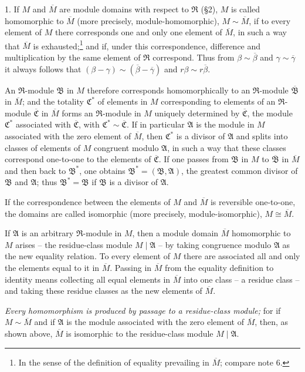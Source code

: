 \documentclass[11pt]{article}
\providecommand{\mR}{\mathfrak{R}}
\providecommand{\mA}{\mathfrak{A}}
\providecommand{\mB}{\mathfrak{B}}
\providecommand{\mC}{\mathfrak{C}}
\begin{document}
1. If $M$ and $\overline M$ are module domains with respect to $\mR$ (§2), $M$ is called homomorphic to $\overline M$ (more precisely, module-homomorphic), $M\sim\overline M$, if to every element of $M$ there corresponds one and only one element of $\overline M$, in such a way that $\overline M$ is exhausted;\footnote{In the sense of the definition of equality prevailing in $\overline M$; compare note 6.} and if, under this correspondence, difference and multiplication by the same element of $\mR$ correspond. Thus from $\beta\sim\overline\beta$ and $\gamma\sim\overline\gamma$ it always follows that $(\beta-\gamma)\sim(\overline\beta-\overline\gamma)$ and $r\beta\sim r\overline\beta$.

An $\mR$-module $\mB$ in $M$ therefore corresponds homomorphically to an $\mR$-module $\overline{\mB}$ in $\overline M$; and the totality $\mC^*$ of elements in $M$ corresponding to elements of an $\mR$-module $\overline{\mC}$ in $\overline M$ forms an $\mR$-module in $M$ uniquely determined by $\overline{\mC}$, the module $\mC^*$ associated with $\overline{\mC}$, with $\mC^*\sim\overline{\mC}$. If in particular $\mA$ is the module in $M$ associated with the zero element of $\overline M$, then $\mC^*$ is a divisor of $\mA$ and splits into classes of elements of $M$ congruent modulo $\mA$, in such a way that these classes correspond one-to-one to the elements of $\overline{\mC}$. If one passes from $\mB$ in $M$ to $\overline{\mB}$ in $\overline M$ and then back to $\mB^*$, one obtains $\mB^*=(\mB,\mA)$, the greatest common divisor of $\mB$ and $\mA$; thus $\mB^*=\mB$ if $\mB$ is a divisor of $\mA$.

If the correspondence between the elements of $M$ and $\overline M$ is reversible one-to-one, the domains are called isomorphic (more precisely, module-isomorphic), $M\cong\overline M$.

If $\mA$ is an arbitrary $\mR$-module in $M$, then a module domain $\overline M$ homomorphic to $M$ arises -- the residue-class module $M\mid\mA$ -- by taking congruence modulo $\mA$ as the new equality relation. To every element of $M$ there are associated all and only the elements equal to it in $\overline M$. Passing in $\overline M$ from the equality definition to identity means collecting all equal elements in $\overline M$ into one class -- a residue class -- and taking these residue classes as the new elements of $\overline M$.

\emph{Every homomorphism is produced by passage to a residue-class module;} for if $M\sim\overline M$ and if $\mA$ is the module associated with the zero element of $\overline M$, then, as shown above, $\overline M$ is isomorphic to the residue-class module $M\mid\mA$.
\end{document}
